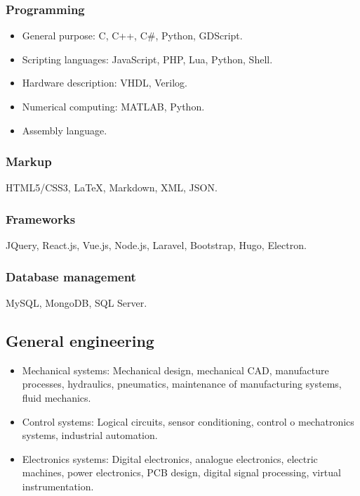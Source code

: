 \documentclass{article}
\begin{document}
    \subsubsection{Programming}

    \begin{itemize}
      \item General purpose: C, C++, C\#, Python, GDScript.
      \item Scripting languages: JavaScript, PHP, Lua, Python, Shell.
      \item Hardware description: VHDL, Verilog.
      \item Numerical computing: MATLAB, Python.
      \item Assembly language.
    \end{itemize}

    \subsubsection{Markup}

    HTML5/CSS3, {\LaTeX}, Markdown, XML, JSON\@.

    \subsubsection{Frameworks}

    JQuery, React.js, Vue.js, Node.js, Laravel, Bootstrap, Hugo, Electron.

    \subsubsection{Database management}

    MySQL, MongoDB, SQL Server.

    \subsection{General engineering}
    \begin{itemize}
      \item Mechanical systems: Mechanical design, mechanical CAD, manufacture processes, hydraulics, pneumatics, maintenance of manufacturing systems, fluid mechanics.
      \item Control systems: Logical circuits, sensor conditioning, control o mechatronics systems, industrial automation.
      \item Electronics systems: Digital electronics, analogue electronics, electric machines, power electronics, PCB design, digital signal processing, virtual instrumentation.
    \end{itemize}
\end{document}
